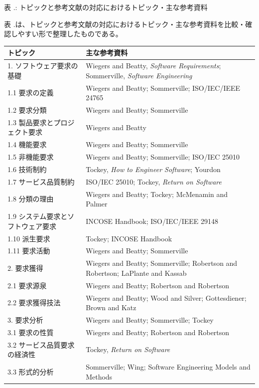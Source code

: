 \documentclass[a4paper,11pt]{ltjsarticle}
\renewcommand{\thesection}{\arabic{section}}
\renewcommand{\thetable}{\thesection.\arabic{table}}
\numberwithin{figure}{section}
\numberwithin{table}{section}
\begin{document}
\small
\par\smallskip\noindent{}\label{tab:ch01-12}表 \thetable: トピックと参考文献の対応におけるトピック・主な参考資料\par\smallskip
表 \thetable は、トピックと参考文献の対応におけるトピック・主な参考資料を比較・確認しやすい形で整理したものである。\par\smallskip
\begin{longtable}{@{}p{.38\linewidth}p{.55\linewidth}@{}}
\toprule
トピック & 主な参考資料 \\
\midrule
\endhead
1. ソフトウェア要求の基礎 & Wiegers and Beatty, \textit{Software Requirements}; Sommerville, \textit{Software Engineering} \\
1.1 要求の定義 & Wiegers and Beatty; Sommerville; ISO/IEC/IEEE 24765 \\
1.2 要求分類 & Wiegers and Beatty; Sommerville \\
1.3 製品要求とプロジェクト要求 & Wiegers and Beatty \\
1.4 機能要求 & Wiegers and Beatty; Sommerville \\
1.5 非機能要求 & Wiegers and Beatty; Sommerville; ISO/IEC 25010 \\
1.6 技術制約 & Tockey, \textit{How to Engineer Software}; Yourdon \\
1.7 サービス品質制約 & ISO/IEC 25010; Tockey, \textit{Return on Software} \\
1.8 分類の理由 & Wiegers and Beatty; Tockey; McMenamin and Palmer \\
1.9 システム要求とソフトウェア要求 & INCOSE Handbook; ISO/IEC/IEEE 29148 \\
1.10 派生要求 & Tockey; INCOSE Handbook \\
1.11 要求活動 & Wiegers and Beatty; Sommerville \\
2. 要求獲得 & Wiegers and Beatty; Sommerville; Robertson and Robertson; LaPlante and Kassab \\
2.1 要求源泉 & Wiegers and Beatty; Robertson and Robertson \\
2.2 要求獲得技法 & Wiegers and Beatty; Wood and Silver; Gottesdiener; Brown and Katz \\
3. 要求分析 & Wiegers and Beatty; Sommerville; Tockey \\
3.1 要求の性質 & Wiegers and Beatty; Robertson and Robertson \\
3.2 サービス品質要求の経済性 & Tockey, \textit{Return on Software} \\
3.3 形式的分析 & Sommerville; Wing; Software Engineering Models and Methods \\

\end{longtable}
\end{document}
